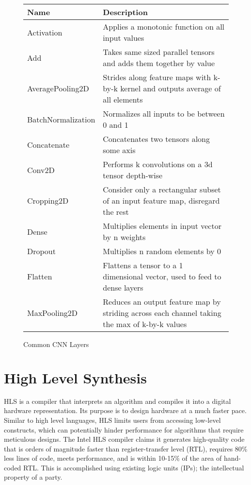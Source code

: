 \begin{figure}
	\centering
	\tiny
	\begin{tabular}{ |p{4cm}|p{11.6cm}|  }
		\hline
		Name & Description \\
		\hline
		Activation & Applies a monotonic function on all input values\\
		Add & Takes same sized parallel tensors and adds them together by value \\
		AveragePooling2D & Strides along feature maps with k-by-k kernel and outputs average of all elements \\
		BatchNormalization & Normalizes all inputs to be between 0 and 1 \\
		Concatenate & Concatenates two tensors along some axis \\
		Conv2D & Performs k convolutions on a 3d tensor depth-wise \\
		Cropping2D & Consider only a rectangular subset of an input feature map, disregard the rest \\
		Dense & Multiplies elements in input vector by n weights \\
		Dropout & Multiplies n random elements by 0 \\
		Flatten & Flattens a tensor to a 1 dimensional vector, used to feed to dense layers \\
		MaxPooling2D & Reduces an output feature map by striding across each channel taking the max of k-by-k values \\
		\hline
	\end{tabular}
	\label{layer_types}
	\caption{Common CNN Layers}
\end{figure}

\section{High Level Synthesis}
HLS is a compiler that interprets an algorithm and compiles it into a digital hardware representation. Its purpose is to design hardware at a much faster pace. Similar to high level languages, HLS limits users from accessing low-level constructs, which can potentially hinder performance for algorithms that require meticulous designs. The Intel HLS compiler claims it generates high-quality code that is orders of magnitude faster than register-transfer level (RTL), requires 80\% less lines of code, meets performance, and is within 10-15\% of the area of hand- coded RTL. This is accomplished using existing logic units (IPs); the intellectual property of a party.

